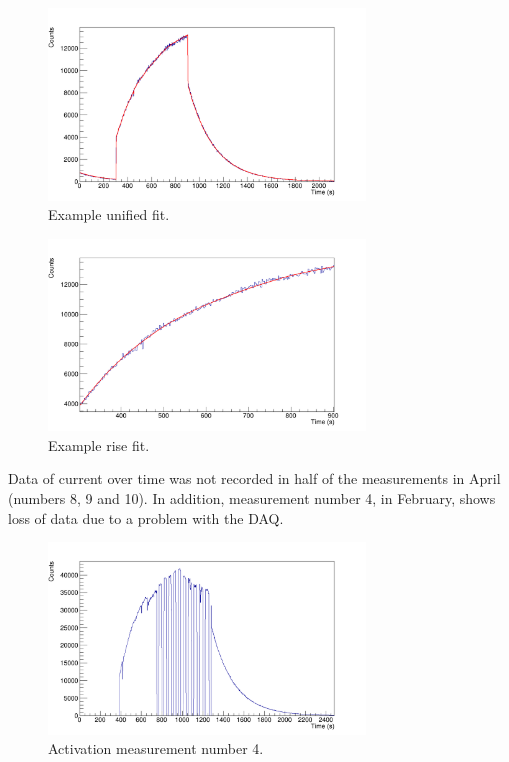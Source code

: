 \documentclass[a4paper,12pt]{report}
\begin{document}
\begin{figure}[H]
	\centering
	\includegraphics[width=0.75\textwidth]{example_unified_fit.png}
	\caption{Example unified fit.}
	\label{example_unified_fit}
\end{figure}

\begin{figure}[H]
	\centering
	\includegraphics[width=0.75\textwidth]{example_rise_fit.png}
	\caption{Example rise fit.}
	\label{example_rise_fit}
\end{figure}

Data of current over time was not recorded in half of the measurements in April (numbers 8, 9 and 10).	%
In addition, measurement number 4, in February, shows loss of data due to a problem with the DAQ.

\begin{figure}[H]
	\centering
	\includegraphics[width=0.75\textwidth]{activation_4_time.png}
	\caption{Activation measurement number 4.}
	\label{activation_4_time}
\end{figure}
\end{document}
